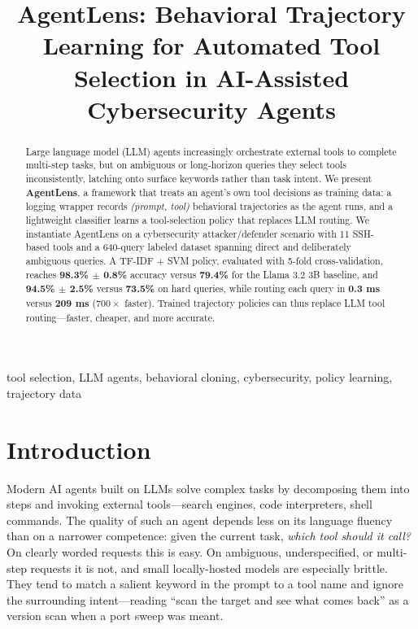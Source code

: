 \documentclass[conference]{IEEEtran}
\begin{document}
\title{AgentLens: Behavioral Trajectory Learning for
Automated Tool Selection in AI-Assisted Cybersecurity Agents}

\author{
}

\maketitle

\begin{abstract}
Large language model (LLM) agents increasingly orchestrate external tools to
complete multi-step tasks, but on ambiguous or long-horizon queries they select
tools inconsistently, latching onto surface keywords rather than task intent. We
present \textbf{AgentLens}, a framework that treats an agent's own tool
decisions as training data: a logging wrapper records \emph{(prompt, tool)}
behavioral trajectories as the agent runs, and a lightweight classifier learns a
tool-selection policy that replaces LLM routing. We instantiate AgentLens on a
cybersecurity attacker/defender scenario with 11 SSH-based tools and a 640-query
labeled dataset spanning direct and deliberately ambiguous queries. A TF-IDF $+$
SVM policy, evaluated with 5-fold cross-validation, reaches
\textbf{98.3\% $\pm$ 0.8\%} accuracy versus \textbf{79.4\%} for the Llama 3.2 3B
baseline, and \textbf{94.5\% $\pm$ 2.5\%} versus \textbf{73.5\%} on hard queries,
while routing each query in \textbf{0.3 ms} versus \textbf{209 ms}
($700\times$ faster). Trained trajectory policies can thus replace LLM tool
routing---faster, cheaper, and more accurate.
\end{abstract}

\begin{IEEEkeywords}
tool selection, LLM agents, behavioral cloning, cybersecurity, policy learning,
trajectory data
\end{IEEEkeywords}

\section{Introduction}

Modern AI agents built on LLMs solve complex tasks by decomposing them into
steps and invoking external tools---search engines, code interpreters, shell
commands. The quality of such an agent depends less on its language fluency than
on a narrower competence: given the current task, \emph{which tool should it
call?} On clearly worded requests this is easy. On ambiguous, underspecified, or
multi-step requests it is not, and small locally-hosted models are especially
brittle. They tend to match a salient keyword in the prompt to a tool name and
ignore the surrounding intent---reading ``scan the target and see what comes
back'' as a version scan when a port sweep was meant.
\end{document}
